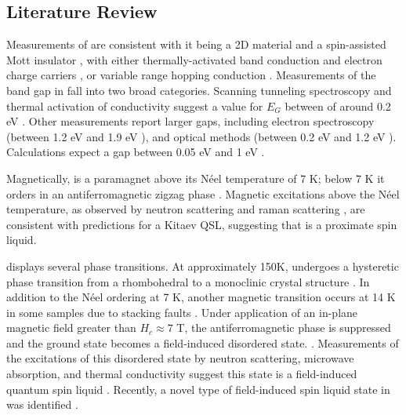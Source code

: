 \documentclass[11pt]{article}
\begin{document}
\begin{multicols}{2}
\section{Literature Review}
Measurements of \rucl are consistent with it being a 2D material \cite{Kim2015a} and a spin-assisted Mott insulator \cite{Plumb2014}, with either thermally-activated band conduction and electron charge carriers \cite{Rojas1983}, or variable range hopping conduction \cite{Mashhadi2018}. Measurements of the band gap in \rucl fall into two broad categories. Scanning tunneling spectroscopy and thermal activation of conductivity suggest a value for $E_{G}$ between of around 0.2 eV \cite{Binotto1971,Rojas1983,Ziatdinov2016}. Other measurements report larger gaps, including electron spectroscopy (between 1.2 eV and 1.9 eV \cite{Koitzsch2016,Zhou2016,Sinn2016}), and optical methods (between 0.2 eV and 1.2 eV \cite{Reschke2017,Pollini1996,Sandilands2016}). Calculations expect a gap between 0.05 eV and 1 eV  \cite{Sarikurt2017,Kim2015}.

Magnetically, \rucl is a paramagnet above its N{\'e}el temperature of 7 K; below 7 K it orders in an antiferromagnetic zigzag phase \cite{Sears2015}. Magnetic excitations above the N{\'e}el temperature, as observed by neutron scattering and raman scattering \cite{Banerjee2016,Sandilands2015}, are consistent with predictions for a Kitaev QSL, suggesting that \rucl is a proximate spin liquid.

\rucl displays several phase transitions. At approximately 150K, \rucl  undergoes a hysteretic phase transition from a rhombohedral to a monoclinic crystal structure \cite{Kubota2015,Ziatdinov2016,Glamazda2017,Reschke2017}. In addition to the N{\'e}el ordering at 7 K, another magnetic transition occurs at 14 K in some samples due to stacking faults \cite{Banerjee2016}. Under application of an in-plane magnetic field greater than $H_{c} \approx 7$ T, the antiferromagnetic phase is suppressed and the ground state becomes a field-induced disordered state. \cite{Hentrich2017,Wolter2017,Banerjee2017,Wang2017,Baek2017}. Measurements of the excitations of this disordered state by neutron scattering, microwave absorption, and thermal conductivity suggest this state is a field-induced quantum spin liquid \cite{Banerjee2016,Wellm2017,Kasahara2018}. Recently, a novel type of field-induced spin liquid state in \rucl was identified \cite{Lampen-Kelley2018}.


\end{multicols}
\end{document}
